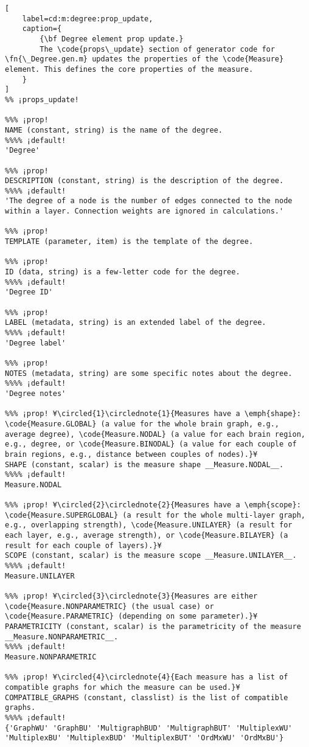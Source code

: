 \documentclass{tufte-handout}
\begin{document}
\begin{lstlisting}[
	label=cd:m:degree:prop_update,
	caption={
		{\bf Degree element prop update.}
		The \code{props\_update} section of generator code for \fn{\_Degree.gen.m} updates the properties of the \code{Measure} element. This defines the core properties of the measure.
	}
]
%% ¡props_update!

%%% ¡prop!
NAME (constant, string) is the name of the degree.
%%%% ¡default!
'Degree'

%%% ¡prop!
DESCRIPTION (constant, string) is the description of the degree.
%%%% ¡default!
'The degree of a node is the number of edges connected to the node within a layer. Connection weights are ignored in calculations.'

%%% ¡prop!
TEMPLATE (parameter, item) is the template of the degree.

%%% ¡prop!
ID (data, string) is a few-letter code for the degree.
%%%% ¡default!
'Degree ID'

%%% ¡prop!
LABEL (metadata, string) is an extended label of the degree.
%%%% ¡default!
'Degree label'

%%% ¡prop!
NOTES (metadata, string) are some specific notes about the degree.
%%%% ¡default!
'Degree notes'

%%% ¡prop! ¥\circled{1}\circlednote{1}{Measures have a \emph{shape}: \code{Measure.GLOBAL} (a value for the whole brain graph, e.g., average degree), \code{Measure.NODAL} (a value for each brain region, e.g., degree, or \code{Measure.BINODAL} (a value for each couple of brain regions, e.g., distance between couples of nodes).}¥
SHAPE (constant, scalar) is the measure shape __Measure.NODAL__.
%%%% ¡default!
Measure.NODAL

%%% ¡prop! ¥\circled{2}\circlednote{2}{Measures have a \emph{scope}: \code{Measure.SUPERGLOBAL} (a result for the whole multi-layer graph, e.g., overlapping strength), \code{Measure.UNILAYER} (a result for each layer, e.g., average strength), or \code{Measure.BILAYER} (a result for each couple of layers).}¥
SCOPE (constant, scalar) is the measure scope __Measure.UNILAYER__.
%%%% ¡default!
Measure.UNILAYER

%%% ¡prop! ¥\circled{3}\circlednote{3}{Measures are either \code{Measure.NONPARAMETRIC} (the usual case) or \code{Measure.PARAMETRIC} (depending on some parameter).}¥
PARAMETRICITY (constant, scalar) is the parametricity of the measure __Measure.NONPARAMETRIC__.
%%%% ¡default!
Measure.NONPARAMETRIC

%%% ¡prop! ¥\circled{4}\circlednote{4}{Each measure has a list of compatible graphs for which the measure can be used.}¥
COMPATIBLE_GRAPHS (constant, classlist) is the list of compatible graphs.
%%%% ¡default!
{'GraphWU' 'GraphBU' 'MultigraphBUD' 'MultigraphBUT' 'MultiplexWU' 'MultiplexBU' 'MultiplexBUD' 'MultiplexBUT' 'OrdMxWU' 'OrdMxBU'}


\end{lstlisting}
\end{document}
